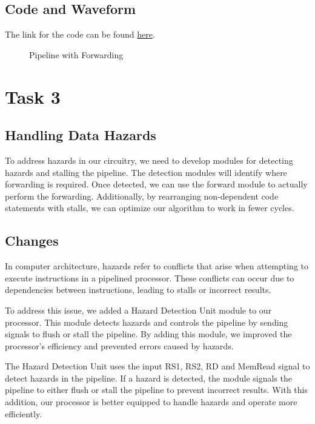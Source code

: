 \documentclass{report}
\begin{document}
\subsection{Code and Waveform}
The link for the code can be found \href{https://github.com/AliMuhammadAsad/Computer-Architecture-Spring-23/tree/main/RISC_V%20Pipelined%20Processor}{here}.
\begin{figure}[h]
    \centering
    \caption{Pipeline with Forwarding}
    \label{fig: Pipeline with Forwarding}
\end{figure}

\section{Task 3}

\subsection{Handling Data Hazards}

To address hazards in our circuitry, we need to develop modules for detecting hazards and stalling the pipeline. The detection modules will identify where forwarding is required. Once detected, we can use the forward module to actually perform the forwarding. Additionally, by rearranging non-dependent code statements with stalls, we can optimize our algorithm to work in fewer cycles.

\subsection{Changes}

In computer architecture, hazards refer to conflicts that arise when attempting to execute instructions in a pipelined processor. These conflicts can occur due to dependencies between instructions, leading to stalls or incorrect results.

To address this issue, we added a Hazard Detection Unit module to our processor. This module detects hazards and controls the pipeline by sending signals to flush or stall the pipeline. By adding this module, we improved the processor's efficiency and prevented errors caused by hazards.

The Hazard Detection Unit uses the input RS1, RS2, RD and MemRead signal to detect hazards in the pipeline. If a hazard is detected, the module signals the pipeline to either flush or stall the pipeline to prevent incorrect results. With this addition, our processor is better equipped to handle hazards and operate more efficiently.
\end{document}
